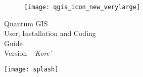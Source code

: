 
\begin{titlepage}
\begin{center}

\begin{figure}[H]
\begin{center}
\texttt{[image: qgis\_icon\_new\_verylarge]} 
\end{center}
\end{figure}

\Huge{Quantum GIS}\\
\vspace{0.5cm}
\Large{User, Installation and Coding \\Guide} \\
\vspace{0.5cm}
\large{Version ~\CURRENT \textsl{'Kore'}}

\texttt{[image: splash]} 

\end{center}
\end{titlepage}

